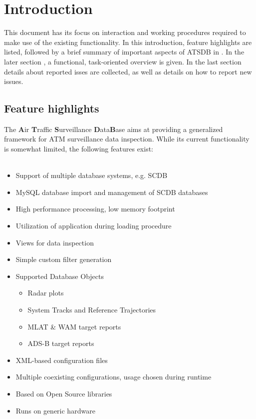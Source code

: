 \chapter{Introduction}

This document has its focus on interaction and working procedures required to make use of the existing
functionality. In this introduction, feature highlights are listed, followed by a brief summary of important aspects of  ATSDB in . In the later section , a functional, task-oriented overview is given. In the last section  details about reported isses are collected, as well as details on how to report new issues.

\section{Feature highlights}

The \textbf{A}ir \textbf{T}raffic \textbf{S}urveillance \textbf{D}ata\textbf{B}ase aims at providing a generalized framework for ATM surveillance data inspection. While its current functionality is somewhat limited, the following features exist:\\\\

\begin{itemize}  
\item Support of multiple database systems, e.g. SCDB
\item MySQL database import and management of SCDB databases
\item High performance processing, low memory footprint
\item Utilization of application during loading procedure
\item Views for data inspection
\item Simple custom filter generation
\item Supported Database Objects
\begin{itemize}  
\item Radar plots
\item System Tracks and Reference Trajectories
\item MLAT \& WAM target reports
\item ADS-B target reports
\end{itemize}
\item XML-based configuration files
\item Multiple coexisting configurations, usage chosen during runtime
\item Based on Open Source libraries
\item Runs on generic hardware
\end{itemize}

